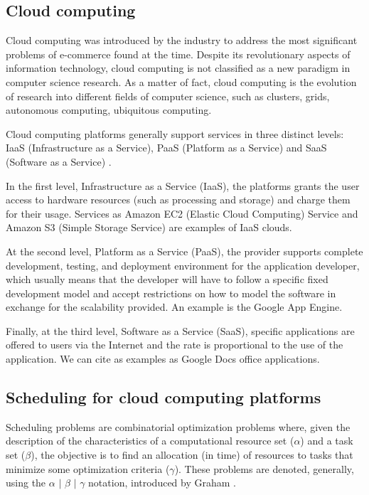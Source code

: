 \documentclass[12pt,a4paper]{article}
\begin{document}
\subsection{Cloud computing}

Cloud computing was introduced by the industry to address the most significant problems of e-commerce found at the time. Despite its revolutionary aspects of information technology, cloud computing is not classified as a new paradigm in computer science research. As a matter of fact, cloud computing is the evolution of research into different fields of computer science, such as clusters, grids, autonomous computing, ubiquitous computing. 

Cloud computing platforms generally support services in three distinct levels: IaaS (Infrastructure as a Service), PaaS (Platform as a Service) and SaaS (Software as a Service) \citep{fos08}. 

In the first level, Infrastructure as a Service (IaaS), the platforms grants the user access to hardware resources (such as processing and storage) and charge them for their usage. Services as Amazon EC2 (Elastic Cloud Computing) Service and Amazon S3 (Simple Storage Service) are examples of IaaS clouds.  

At the second level, Platform as a Service (PaaS), the provider supports complete development, testing, and deployment environment for the application developer, which usually means that the developer will have to follow a specific fixed development model and accept restrictions on how to model the software in exchange for the scalability provided. An example is the Google App Engine. 

Finally, at the third level, Software as a Service (SaaS), specific applications are offered to users via the Internet and the rate is proportional to the use of the application. We can cite as examples as Google Docs office applications.

\subsection{Scheduling for cloud computing platforms}

Scheduling problems are combinatorial optimization problems where, given the description of the characteristics of a computational resource set ($\alpha$) and a task set ($\beta$), the objective is to find an allocation (in time) of resources to tasks that minimize some optimization criteria ($\gamma$). These problems are denoted, generally, using the $\alpha$ $\vert$ $\beta$ $\vert$ $\gamma$ notation, introduced by Graham \citep{graham}.
\end{document}

